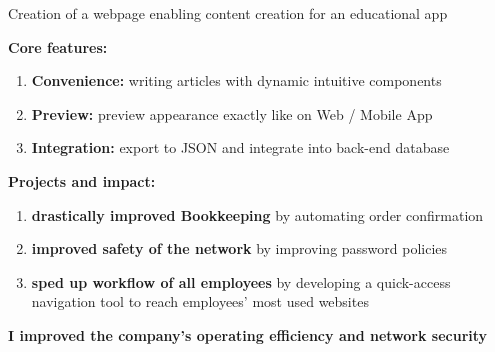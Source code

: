 \documentclass[]{jonas-cv}
\begin{document}
\begin{minipage}[t]{0.63\textwidth} 


\tinysectionsep

\sectionsep

\begin{tightemize}
    \item Creation of a webpage enabling content creation for an educational app 
    \item \textbf{Core features:}
    \begin{enumerate}
        \item \textbf{Convenience:} writing articles with dynamic intuitive components
        \item \textbf{Preview:} preview appearance exactly like on Web / Mobile App
        \item \textbf{Integration:} export to JSON and integrate into back-end database
    \end{enumerate}
\end{tightemize}
\largesectionsep



\begin{tightemize}
    \item \textbf{Projects and impact:}
    \begin{enumerate}
        \item \textbf{drastically improved Bookkeeping} by automating order confirmation
        \item \textbf{improved safety of the network} by improving password policies
        \item \textbf{sped up workflow of all employees} by developing a quick-access navigation tool to reach employees' most used websites
    \end{enumerate}
    \vspace{1mm}
    \item [\faicon{angle-double-right}] \textbf{I improved the company's operating efficiency and network security}
\end{tightemize}
\largesectionsep


\end{minipage}
\end{document}
